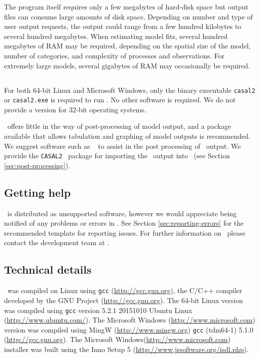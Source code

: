 The program itself requires only a few megabytes of hard-disk space but output files can consume large amounts of disk space. Depending on number and type of user output requests, the output could range from a few hundred kilobytes to several hundred megabytes. When estimating model fits, several hundred megabytes of RAM may be required, depending on the spatial size of the model, number of categories, and complexity of processes and observations. For extremely large models, several gigabytes of RAM may occasionally be required. 

\subsection{}

For both 64-bit Linux and Microsoft Windows, only the binary executable \texttt{casal2} or \texttt{casal2.exe} is required to run \CNAME . No other software is required. We do not provide a version for 32-bit operating systems. 

\CNAME\ offers little in the way of post-processing of model output, and a package available that allows tabulation and graphing of model outputs is recommended. We suggest software such as \href{http://www.r-project.org}{\R}\ \citep{R} to assist in the post processing of \CNAME\ output. We provide the \texttt{CASAL2} \R\ package for importing the \CNAME\ output into \R\ (see Section \ref{sec:post-processing}).

\subsection{Getting help}

\CNAME\ is distributed as unsupported software, however we would appreciate being notified of any problems or errors in \CNAME. See Section \ref{sec:reporting-errors} for the recommended template for reporting issues. For further information on \CNAME\, please contact the development team at \email .

\subsection{Technical details}\label{sec:tech}

\CNAME\ was compiled on Linux using \texttt{gcc} (\url{http://gcc.gnu.org}), the C/C++ compiler developed by the GNU Project (\url{http://gcc.gnu.org}). The 64-bit Linux  version was compiled using \texttt{gcc} version 5.2.1 20151010 Ubuntu Linux (\url{http://www.ubuntu.com/}). The Microsoft Windows (\url{http://www.microsoft.com}) version was compiled using MingW (\url{http://www.mingw.org}) \texttt{gcc} (tdm64-1) 5.1.0 (\url{http://gcc.gnu.org}). The Microsoft Windows(\url{http://www.microsoft.com}) installer was built using the Inno Setup 5 (\url{http://www.jrsoftware.org/isdl.php}).

